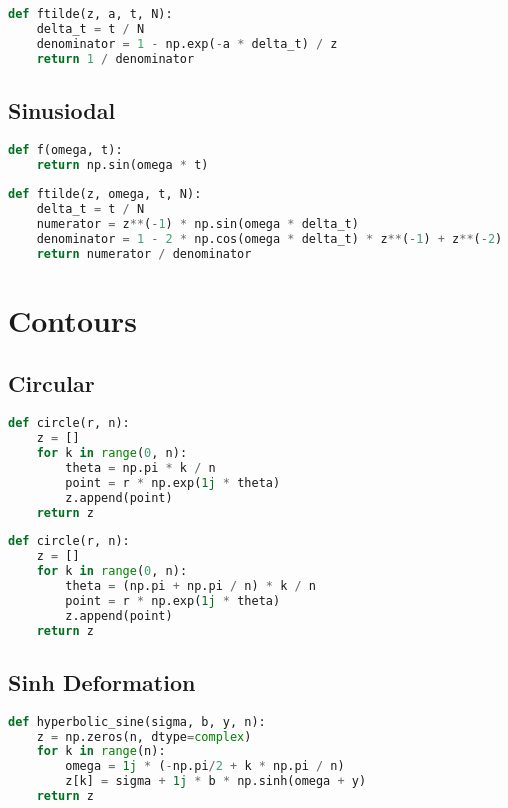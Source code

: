 \begin{appendices}
\begin{lstlisting}[language=Python, caption= Implementation of the Decaying Exp function and its $\mathcal{Z}$-transform (Section \ref{section:decaying_exp})]
def ftilde(z, a, t, N):
    delta_t = t / N
    denominator = 1 - np.exp(-a * delta_t) / z
    return 1 / denominator
\end{lstlisting}

\newpage
\subsection{Sinusiodal}
\begin{lstlisting}[language=Python, caption= Implementation of the Sinusoidal function and its $\mathcal{Z}$-transform (Section \ref{section:sinusoidal})]
def f(omega, t):
    return np.sin(omega * t)
    
def ftilde(z, omega, t, N):
    delta_t = t / N
    numerator = z**(-1) * np.sin(omega * delta_t)
    denominator = 1 - 2 * np.cos(omega * delta_t) * z**(-1) + z**(-2)
    return numerator / denominator
\end{lstlisting}

\newpage
\section{Contours}

\subsection{Circular}
\begin{lstlisting}[language=Python, caption= Implementation of a circular contour from $0 \leq \theta < \pi$.]
def circle(r, n):
    z = []
    for k in range(0, n):
        theta = np.pi * k / n
        point = r * np.exp(1j * theta)
        z.append(point)
    return z
\end{lstlisting}

\begin{lstlisting}[language=Python, caption= Implementation of a circular contour from $0 \leq \theta \leq \pi$.]
def circle(r, n):
    z = []
    for k in range(0, n):
        theta = (np.pi + np.pi / n) * k / n
        point = r * np.exp(1j * theta)
        z.append(point)
    return z
\end{lstlisting}

\subsection{Sinh Deformation}
\begin{lstlisting}[language=Python, caption= Implementation of the conformal mapping (Equation \ref{equation:conformal_mapping}) from $-\frac{\pi}{2} \leq \omega < \frac{\pi}{2}$.]
def hyperbolic_sine(sigma, b, y, n):
    z = np.zeros(n, dtype=complex)
    for k in range(n):
        omega = 1j * (-np.pi/2 + k * np.pi / n)
        z[k] = sigma + 1j * b * np.sinh(omega + y)
    return z
\end{lstlisting}


\end{appendices}

